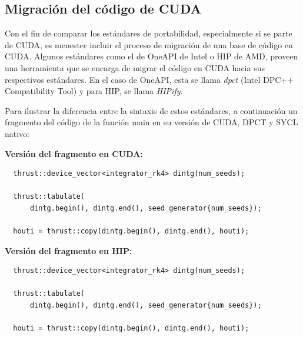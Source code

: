 \subsection{Migración del código de CUDA}


Con el fin de comparar los estándares de portabilidad,
especialmente si se parte de CUDA, es menester incluir el proceso de migración de una base de código en CUDA. Algunos estándares como el de OneAPI de Intel o HIP de AMD, proveen una herramienta que se encarga de migrar el código en CUDA hacia sus respectivos estándares. En el caso de OneAPI, esta se llama \textit{dpct} (Intel DPC++ Compatibility Tool) y para HIP, se llama \textit{HIPify}.


Para ilustrar la diferencia entre la sintaxis de estos estándares, a continuación un fragmento del código de la función main en su versión de CUDA, DPCT y SYCL nativo:

\textbf{Versión del fragmento en CUDA:}

\begin{lstlisting}
  thrust::device_vector<integrator_rk4> dintg(num_seeds); 

  thrust::tabulate(
      dintg.begin(), dintg.end(), seed_generator{num_seeds}); 

  houti = thrust::copy(dintg.begin(), dintg.end(), houti); 
\end{lstlisting}

\textbf{Versión del fragmento en HIP:}

\begin{lstlisting}
  thrust::device_vector<integrator_rk4> dintg(num_seeds); 

  thrust::tabulate(
      dintg.begin(), dintg.end(), seed_generator{num_seeds}); 

  houti = thrust::copy(dintg.begin(), dintg.end(), houti); 
\end{lstlisting}

